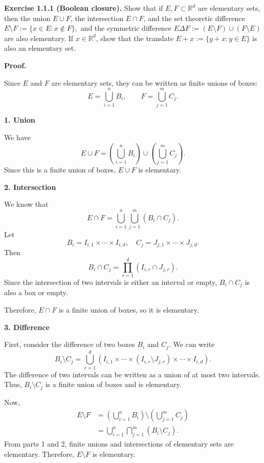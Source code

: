 \begin{exercise}
\noindent\textbf{Exercise 1.1.1 (Boolean closure).}
Show that if $E, F \subset \mathbb{R}^d$ are elementary sets,
then the union $E \cup F$, the intersection $E \cap F$,
and the set theoretic difference
$
E \setminus F := \{x \in E : x \notin F\},
$
and the symmetric difference
$
E \Delta F := (E \setminus F) \cup (F \setminus E)
$
are also elementary. If $x \in \mathbb{R}^d$, show that the translate
$
E + x := \{y + x : y \in E\}
$
is also an elementary set.

\noindent\textbf{Proof.}

Since $E$ and $F$ are elementary sets, they can be written as
finite unions of boxes:
\[
E=\bigcup_{i=1}^{n}B_i,\qquad
F=\bigcup_{j=1}^{m}C_j.
\]

\noindent\textbf{1. Union}

We have
\[
E\cup F
=\left(\bigcup_{i=1}^{n}B_i\right)
\cup\left(\bigcup_{j=1}^{m}C_j\right).
\]
Since this is a finite union of boxes, $E\cup F$ is elementary.

\noindent\textbf{2. Intersection}

We know that
\[
E\cap F
=\bigcup_{i=1}^{n}\bigcup_{j=1}^{m}(B_i\cap C_j).
\]
Let
\[
B_i=I_{i,1}\times\cdots\times I_{i,d},
\quad
C_j=J_{j,1}\times\cdots\times J_{j,d}.
\]
Then
\[
B_i\cap C_j
=\prod_{r=1}^{d}(I_{i,r}\cap J_{j,r}).
\]
Since the intersection of two intervals is either an interval
or empty, $B_i\cap C_j$ is also a box or empty.

Therefore, $E\cap F$ is a finite union of boxes, so it is
elementary.

\noindent\textbf{3. Difference}

First, consider the difference of two boxes $B_i$ and $C_j$.
We can write
\[
B_i\setminus C_j
=\bigcup_{r=1}^{d}
\left(
I_{i,1}\times\cdots\times
(I_{i,r}\setminus J_{j,r})
\times\cdots\times I_{i,d}
\right).
\]
The difference of two intervals can be written as a union
of at most two intervals. Thus, $B_i\setminus C_j$ is a
finite union of boxes and is elementary.

Now,
\[
\begin{aligned}
E\setminus F
&=\left(\bigcup_{i=1}^{n}B_i\right)
\setminus\left(\bigcup_{j=1}^{m}C_j\right)\\
&=\bigcup_{i=1}^{n}\bigcap_{j=1}^{m}
(B_i\setminus C_j).
\end{aligned}
\]
From parts 1 and 2, finite unions and intersections of
elementary sets are elementary. Therefore, $E\setminus F$
is elementary.


\end{exercise}
